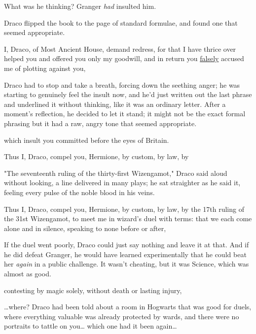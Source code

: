 What was he thinking? Granger \emph{had} insulted him.

Draco flipped the book to the page of standard formulae, and found one that
seemed appropriate.

\begin{writtenNote}
I, Draco, of Most Ancient House, demand redress, for that I have thrice
over helped you and offered you only my goodwill, and in return you
\underline{falsely} accused me of plotting against you,
\end{writtenNote}

Draco had to stop and take a breath, forcing down the seething anger; he was
starting to genuinely feel the insult now, and he'd just written out the last
phrase and underlined it without thinking, like it was an ordinary letter.
After a moment's reflection, he decided to let it stand; it might not be the
exact formal phrasing but it had a raw, angry tone that seemed appropriate.

\begin{writtenNote}
which insult you committed before the eyes of Britain.

Thus I, Draco, compel you, Hermione, by custom, by law, by
\end{writtenNote}

"The seventeenth ruling of the thirty-first Wizengamot," Draco said aloud
without looking, a line delivered in many plays; he sat straighter as he said
it, feeling every pulse of the noble blood in his veins.

\begin{writtenNote}
Thus I, Draco, compel you, Hermione, by custom, by law, by the 17th
ruling of the 31st Wizengamot, to meet me in wizard's duel with terms: that we
each come alone and in silence, speaking to none before or after,
\end{writtenNote}

If the duel went poorly, Draco could just say nothing and leave it at that. And
if he did defeat Granger, he would have learned experimentally that he could
beat her \emph{again} in a public challenge. It wasn't cheating, but it was
Science, which was almost as good.

\begin{writtenNote}
contesting by magic solely, without death or lasting injury,
\end{writtenNote}

{\ldots}where? Draco had been told about a room in Hogwarts that was good for
duels, where everything valuable was already protected by wards, and there were
no portraits to tattle on you{\ldots} which one had it been again{\ldots}

